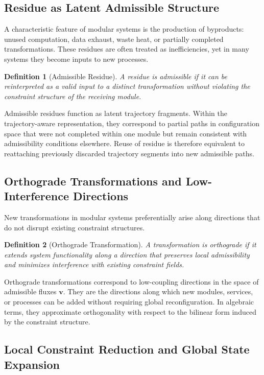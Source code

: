 \documentclass[11pt, a4paper, twocolumn]{article}
\newtheorem{definition}{Definition}[section]
\begin{document}
\subsection{Residue as Latent Admissible Structure}

A characteristic feature of modular systems is the production of byproducts:
unused computation, data exhaust, waste heat, or partially completed
transformations. These residues are often treated as inefficiencies, yet in
many systems they become inputs to new processes.

\begin{definition}[Admissible Residue]
A residue is admissible if it can be reinterpreted as a valid input to a
distinct transformation without violating the constraint structure of the
receiving module.
\end{definition}

Admissible residues function as latent trajectory fragments. Within the
trajectory-aware representation, they correspond to partial paths in
configuration space that were not completed within one module but remain
consistent with admissibility conditions elsewhere. Reuse of residue is
therefore equivalent to reattaching previously discarded trajectory segments
into new admissible paths.

\subsection{Orthograde Transformations and Low-Interference Directions}

New transformations in modular systems preferentially arise along directions
that do not disrupt existing constraint structures.

\begin{definition}[Orthograde Transformation]
A transformation is orthograde if it extends system functionality along a
direction that preserves local admissibility and minimizes interference with
existing constraint fields.
\end{definition}

Orthograde transformations correspond to low-coupling directions in the space
of admissible fluxes $\mathbf{v}$. They are the directions along which new
modules, services, or processes can be added without requiring global
reconfiguration. In algebraic terms, they approximate orthogonality with
respect to the bilinear form induced by the constraint structure.

\subsection{Local Constraint Reduction and Global State Expansion}
\end{document}
